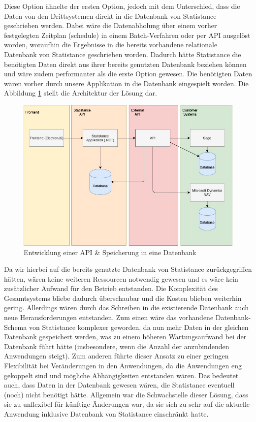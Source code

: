 Diese Option ähnelte der ersten Option, jedoch mit dem Unterschied, dass die Daten von den Drittsystemen direkt in die Datenbank von Statistance geschrieben werden. Dabei wäre die Datenabholung über einem vorher festgelegten Zeitplan (schedule) in einem Batch-Verfahren oder per API ausgelöst worden, woraufhin die Ergebnisse in die bereits vorhandene relationale Datenbank von Statistance geschrieben worden. Dadurch hätte Statistance die benötigten Daten direkt aus ihrer bereits genutzten Datenbank beziehen können und wäre zudem performanter als die erste Option gewesen. Die benötigten Daten wären vorher durch unsere Applikation in die Datenbank eingespielt worden.
Die Abbildung \ref{fig:Entwicklung einer API & Speicherung in eine Datenbank} stellt die Architektur der Lösung dar.

\begin{figure}[!h]
\centering
\includegraphics[width=15cm]{images/0x_implementation_possibilities/opt2.jpg}
\caption{Entwicklung einer API \& Speicherung in eine Datenbank}
\label{fig:Entwicklung einer API & Speicherung in eine Datenbank}
\end{figure}

Da wir hierbei auf die bereits genutzte Datenbank von Statistance zurückgegriffen hätten, wären keine weiteren Ressourcen notwendig gewesen und es wäre kein zusätzlicher Aufwand für den Betrieb entstanden. Die Komplexität des Gesamtsystems bliebe dadurch überschaubar und die Kosten blieben weiterhin gering. Allerdings wären durch das Schreiben in die existierende Datenbank auch neue Herausforderungen entstanden. Zum einen wäre das vorhandene Datenbank-Schema von Statistance komplexer geworden, da nun mehr Daten in der gleichen Datenbank gespeichert werden, was zu einem höheren Wartungsaufwand bei der Datenbank führt hätte (insbesondere, wenn die Anzahl der anzubindenden Anwendungen steigt). Zum anderen führte dieser Ansatz zu einer geringen Flexibilität bei Veränderungen in den Anwendungen, da die Anwendungen eng gekoppelt sind und mögliche Abhängigkeiten entstanden wären. Das bedeutet auch, dass Daten in der Datenbank gewesen wären, die Statistance eventuell (noch) nicht benötigt hätte. Allgemein war die Schwachstelle dieser Lösung, dass sie zu unflexibel für künftige Änderungen war, da sie sich zu sehr auf die aktuelle Anwendung inklusive Datenbank von Statistance einschränkt hatte.